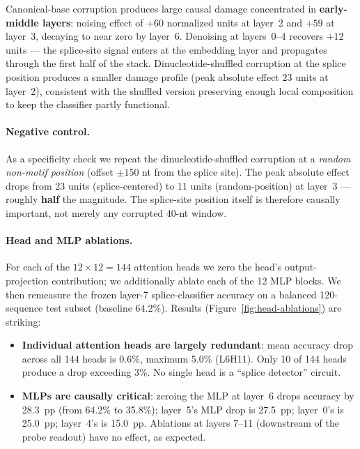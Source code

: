 \documentclass{article}
\begin{document}
Canonical-base corruption produces large causal damage concentrated in
\textbf{early-middle layers}: noising effect of $+60$ normalized units at
layer~2 and $+59$ at layer~3, decaying to near zero by layer~6. Denoising at
layers~0--4 recovers $+12$ units --- the splice-site signal enters at the
embedding layer and propagates through the first half of the stack.
Dinucleotide-shuffled corruption at the splice position produces a smaller
damage profile (peak absolute effect $23$ units at layer~2), consistent
with the shuffled version preserving enough local composition to keep the
classifier partly functional.

\paragraph{Negative control.} As a specificity check we repeat the
dinucleotide-shuffled corruption at a \emph{random non-motif position}
(offset $\pm 150$ nt from the splice site). The peak absolute effect
drops from $23$ units (splice-centered) to $11$ units (random-position) at
layer~3 --- roughly \textbf{half} the magnitude. The splice-site position
itself is therefore causally important, not merely any corrupted 40-nt
window.

\paragraph{Head and MLP ablations.} For each of the $12 \times 12 = 144$
attention heads we zero the head's output-projection contribution; we
additionally ablate each of the 12 MLP blocks. We then remeasure the
frozen layer-7 splice-classifier accuracy on a balanced 120-sequence test
subset (baseline 64.2\%). Results
(Figure~\ref{fig:head-ablations}) are striking:

\begin{itemize}
    \item \textbf{Individual attention heads are largely redundant}: mean
    accuracy drop across all 144 heads is 0.6\%, maximum 5.0\%
    (L6H11). Only 10 of 144 heads produce a drop exceeding 3\%. No single
    head is a ``splice detector'' circuit.
    \item \textbf{MLPs are causally critical}: zeroing the MLP at layer~6
    drops accuracy by 28.3~pp (from 64.2\% to 35.8\%); layer~5's MLP drop is
    27.5~pp; layer~0's is 25.0~pp; layer~4's is 15.0~pp. Ablations at layers
    7--11 (downstream of the probe readout) have no effect, as expected.
\end{itemize}
\end{document}
